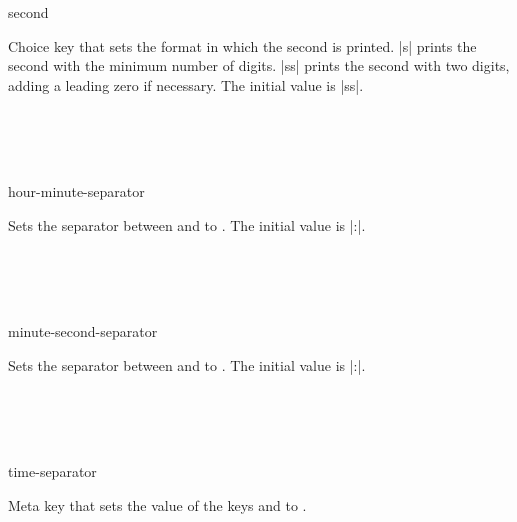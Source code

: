 \documentclass{beerydoc}
\begin{document}
\begin{codedoc}{second}
  \begin{syntax}
  \end{syntax}
  Choice key that sets the format in which the second is printed.
  |s| prints the second with the minimum number of digits.
  |ss| prints the second with two digits, adding a leading zero if necessary.
  The initial value is |ss|.
  \begin{codedemo}
    \\
    \\
    \\
  \end{codedemo}
\end{codedoc}

\begin{codedoc}{hour-minute-separator}
  \begin{syntax}
  \end{syntax}
  Sets the separator between  and  to
  .
  The initial value is |:|.
  \begin{codedemo}
    \\
    \\
    \\
  \end{codedemo}
\end{codedoc}

\begin{codedoc}{minute-second-separator}
  \begin{syntax}
  \end{syntax}
  Sets the separator between  and  to
  .
  The initial value is |:|.
  \begin{codedemo}
    \\
    \\
    \\
  \end{codedemo}
\end{codedoc}

\begin{codedoc}{time-separator}
  \begin{syntax}
  \end{syntax}
  Meta key that sets the value of the keys  and
   to .
\end{codedoc}
\end{document}
